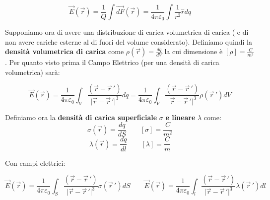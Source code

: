 \documentclass{book}
\begin{document}
\[
\vec{E}(\vec{r})=\frac{1}{Q}\int \vec{dF}(\vec{r})=  \frac{1}{4\pi\varepsilon_0} \int \frac{1}{r^2}\hat{r}dq
\]

Supponiamo ora di avere una distribuzione di carica volumetrica di carica ( e di non avere cariche esterne al di fuori del volume considerato).
Definiamo quindi la \textbf{densità volumetrica di carica} come $\rho(\vec{r})=\frac{dq}{dV} $
la cui dimensione è $[\rho]=\frac{C}{m^3}$.
Per quanto visto prima il Campo Elettrico (per una densità di carica volumetrica) sarà:

\[
\vec{E}(\vec{r})=\frac{1}{4\pi\varepsilon_0} \int_{V} \frac{(\vec{r} - \vec{r}\,' )}{ \lvert{\vec{r} - \vec{r}\,' } \rvert ^3}dq = \frac{1}{4\pi\varepsilon_0} \int_{V} \frac{(\vec{r} - \vec{r}\,' ) }{ \lvert{\vec{r} - \vec{r}\,' } \rvert ^3}\rho(\vec{r}\,') dV
\]

Definiamo ora la \textbf{densità di carica superficiale} $\sigma$ \textbf{e lineare} $\lambda$ come: 
\[
\sigma(\vec{r}) = \frac{dq}{dS} 
\qquad 
[\sigma] = \frac{C}{m^2}
\]
\[
\lambda(\vec{r}) = \frac{dq}{dl} 
\qquad 
[\lambda] = \frac{C}{m}
\]

Con campi elettrici: 

\[
\vec{E}(\vec{r}) = \frac{1}{4\pi\varepsilon_0} \int_{S} \frac{(\vec{r} - \vec{r}\,' ) }{ \lvert{\vec{r} - \vec{r}\,' } \rvert ^3}\sigma(\vec{r}\,') dS
\qquad 
\vec{E}(\vec{r}) = \frac{1}{4\pi\varepsilon_0} \int_{l} \frac{(\vec{r} - \vec{r}\,' ) }{ \lvert{\vec{r} - \vec{r}\,' } \rvert ^3}\lambda(\vec{r}\,') dl
\]
\end{document}

